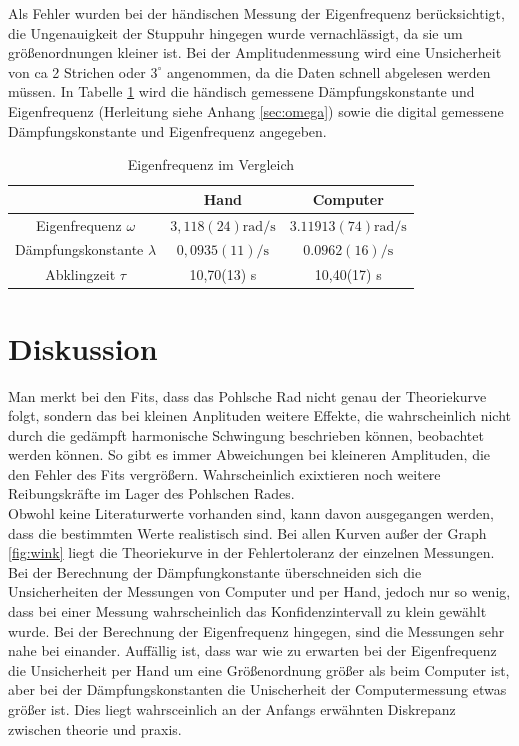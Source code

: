 \documentclass[11pt, a4paper]{article}
\begin{document}
    Als Fehler wurden bei der händischen Messung der Eigenfrequenz berücksichtigt, die Ungenauigkeit der Stuppuhr hingegen
    wurde vernachlässigt, da sie um größenordnungen kleiner ist. Bei der Amplitudenmessung wird eine Unsicherheit von ca 2 Strichen
    oder $3^{\circ}$ angenommen, da die Daten schnell abgelesen werden müssen.
    In Tabelle \ref{Tab:tableeig} wird die händisch gemessene Dämpfungskonstante und Eigenfrequenz (Herleitung siehe Anhang \ref{sec:omega}) sowie die
    digital gemessene Dämpfungskonstante und Eigenfrequenz angegeben. 
    \begin{table}[H]
        \centering
        \begin{tabular}{c c c} 
            & Hand & Computer \\ \hline
            Eigenfrequenz $\omega$ & $3,118(24) \si{\radian\per\second}$ & $3.11913(74) \si{\radian\per\second}$ \\
            Dämpfungskonstante $\lambda$ & $0,0935(11) \si{\per\second}$ & $0.0962(16) \si{\per\second}$ \\
            Abklingzeit $\tau$ & 10,70(13) \si{\second} & 10,40(17) \si{\second} \\

            
        \end{tabular}
        \caption{Eigenfrequenz im Vergleich}
        \label{Tab:tableeig}
    \end{table}

    \section{Diskussion}

    Man merkt bei den Fits, dass das Pohlsche Rad nicht genau der Theoriekurve folgt, sondern das bei kleinen Anplituden
    weitere Effekte, die wahrscheinlich nicht durch die gedämpft harmonische Schwingung beschrieben können, beobachtet werden können.
    So gibt es immer Abweichungen bei kleineren Amplituden, die den Fehler des Fits vergrößern. Wahrscheinlich exixtieren noch weitere
    Reibungskräfte im Lager des Pohlschen Rades. \\

    Obwohl keine Literaturwerte vorhanden sind, kann davon ausgegangen werden, dass die bestimmten Werte realistisch sind.
    Bei allen Kurven außer der Graph \ref{fig:wink} liegt die Theoriekurve in der Fehlertoleranz der einzelnen Messungen.
    Bei der Berechnung der Dämpfungkonstante überschneiden sich die Unsicherheiten der Messungen von Computer und per Hand,
    jedoch nur so  wenig, dass bei einer Messung wahrscheinlich das Konfidenzintervall zu klein gewählt wurde. Bei der
    Berechnung der Eigenfrequenz hingegen, sind die Messungen sehr nahe bei einander. Auffällig ist, dass war wie zu
    erwarten bei der Eigenfrequenz die Unsicherheit per Hand um eine Größenordnung größer als beim Computer ist,
    aber bei der Dämpfungskonstanten die Unischerheit der Computermessung etwas größer ist. Dies liegt wahrsceinlich an der Anfangs
    erwähnten Diskrepanz zwischen theorie und praxis.
\end{document}
